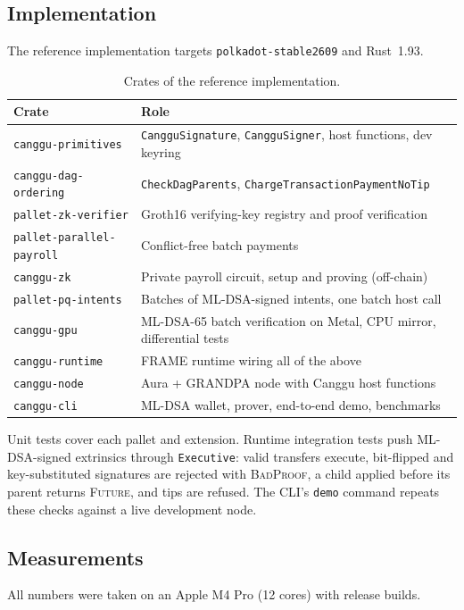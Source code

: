 \documentclass[11pt]{article}
\theoremstyle{definition}
\theoremstyle{remark}
\begin{document}
\subsection{Implementation}
The reference implementation targets \texttt{polkadot-stable2609} and Rust~1.93.

\begin{table}[ht]
\centering\small
\begin{tabularx}{\textwidth}{@{}lX@{}}
\toprule
\textbf{Crate} & \textbf{Role} \\
\midrule
\texttt{canggu-primitives} & \texttt{CangguSignature}, \texttt{CangguSigner}, host functions, dev keyring \\
\texttt{canggu-dag-ordering} & \texttt{CheckDagParents}, \texttt{ChargeTransactionPaymentNoTip} \\
\texttt{pallet-zk-verifier} & Groth16 verifying-key registry and proof verification \\
\texttt{pallet-parallel-payroll} & Conflict-free batch payments \\
\texttt{canggu-zk} & Private payroll circuit, setup and proving (off-chain) \\
\texttt{pallet-pq-intents} & Batches of ML-DSA-signed intents, one batch host call \\
\texttt{canggu-gpu} & ML-DSA-65 batch verification on Metal, CPU mirror, differential tests \\
\texttt{canggu-runtime} & FRAME runtime wiring all of the above \\
\texttt{canggu-node} & Aura + GRANDPA node with Canggu host functions \\
\texttt{canggu-cli} & ML-DSA wallet, prover, end-to-end demo, benchmarks \\
\bottomrule
\end{tabularx}
\caption{Crates of the reference implementation.}
\end{table}

\noindent Unit tests cover each pallet and extension. Runtime integration tests push ML-DSA-signed
extrinsics through \texttt{Executive}: valid transfers execute, bit-flipped and key-substituted
signatures are rejected with \textsc{BadProof}, a child applied before its parent returns
\textsc{Future}, and tips are refused. The CLI's \texttt{demo} command repeats these checks against
a live development node.

\subsection{Measurements}
\label{sec:measure}
All numbers were taken on an Apple M4 Pro (12 cores) with release builds.
\end{document}
